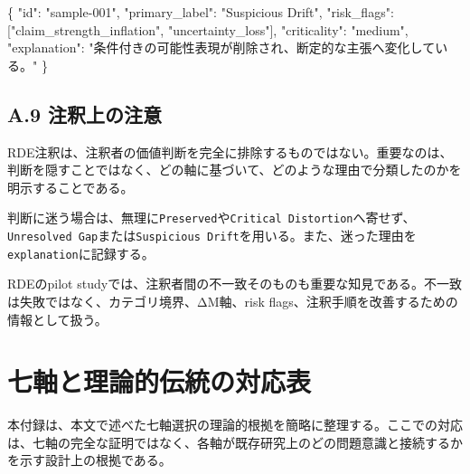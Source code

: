 \documentclass[
  a4paper]{ltjsarticle}
\newenvironment{Shaded}{}{}
\newcommand{\DataTypeTok}[1]{\textcolor[rgb]{0.56,0.13,0.00}{#1}}
\newcommand{\FunctionTok}[1]{\textcolor[rgb]{0.02,0.16,0.49}{#1}}
\newcommand{\OtherTok}[1]{\textcolor[rgb]{0.00,0.44,0.13}{#1}}
\newcommand{\StringTok}[1]{\textcolor[rgb]{0.25,0.44,0.63}{#1}}
\begin{document}
\begin{Shaded}
\begin{Highlighting}[]
\FunctionTok{\{}
  \DataTypeTok{"id"}\FunctionTok{:} \StringTok{"sample{-}001"}\FunctionTok{,}
  \DataTypeTok{"primary\_label"}\FunctionTok{:} \StringTok{"Suspicious Drift"}\FunctionTok{,}
  \DataTypeTok{"risk\_flags"}\FunctionTok{:} \OtherTok{[}\StringTok{"claim\_strength\_inflation"}\OtherTok{,} \StringTok{"uncertainty\_loss"}\OtherTok{]}\FunctionTok{,}
  \DataTypeTok{"criticality"}\FunctionTok{:} \StringTok{"medium"}\FunctionTok{,}
  \DataTypeTok{"explanation"}\FunctionTok{:} \StringTok{"条件付きの可能性表現が削除され、断定的な主張へ変化している。"}
\FunctionTok{\}}
\end{Highlighting}
\end{Shaded}

\subsection{A.9
注釈上の注意}\label{a.9-ux6ce8ux91c8ux4e0aux306eux6ce8ux610f}

RDE注釈は、注釈者の価値判断を完全に排除するものではない。重要なのは、判断を隠すことではなく、どの軸に基づいて、どのような理由で分類したのかを明示することである。

判断に迷う場合は、無理に\texttt{Preserved}や\texttt{Critical\ Distortion}へ寄せず、\texttt{Unresolved\ Gap}または\texttt{Suspicious\ Drift}を用いる。また、迷った理由を\texttt{explanation}に記録する。

RDEのpilot
studyでは、注釈者間の不一致そのものも重要な知見である。不一致は失敗ではなく、カテゴリ境界、ΔM軸、risk
flags、注釈手順を改善するための情報として扱う。


\section{七軸と理論的伝統の対応表}\label{appendix-b-seven-axis-rationale}

本付録は、本文で述べた七軸選択の理論的根拠を簡略に整理する。ここでの対応は、七軸の完全な証明ではなく、各軸が既存研究上のどの問題意識と接続するかを示す設計上の根拠である。
\end{document}

